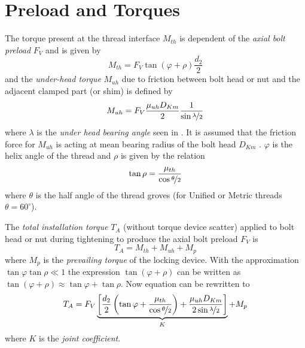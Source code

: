 \section{Preload and Torques}
The torque present at the thread interface $M_{th}$ is dependent of the \emph{axial bolt preload} $F_V$ 
and is given by
\begin{equation}
  M_{th} = F_V \tan(\varphi+\rho)\frac{d_2}{2}
\end{equation}
and the \emph{under-head torque} $M_{uh}$ due to friction between bolt head or nut and the adjacent 
clamped part (or shim) is defined by
\begin{equation}
  M_{uh} = F_V \frac{\mu_{uh} D_{Km}}{2} \frac{1}{\sin{\nicefrac{\lambda}{2}}}
\end{equation}
where $\lambda$ is the \emph{under head bearing angle} seen in .
It is assumed that the friction force for $M_{uh}$ is acting at mean bearing radius of the bolt head 
$D_{Km}$ . $\varphi$ is the helix angle of the thread and $\rho$ is given by the relation
\begin{equation}
  \tan\rho = \frac{\mu_{th}}{\cos\nicefrac{\theta}{2}}
\end{equation}
where $\theta$ is the half angle of the thread groves (for Unified or Metric threads $\theta=60^\circ$).

The \emph{total installation torque} $T_A$ (without torque device scatter) applied to bolt head or nut
during tightening to produce the axial bolt preload $F_V$ is 
\begin{equation}
  T_A = M_{th} + M_{uh} + M_p
  \label{equ:TA}
\end{equation}
where $M_p$ is the \emph{prevailing torque} of the locking device. 
With the approximation $\tan\varphi \tan\rho \ll 1$ the expression $\tan(\varphi+\rho)$ can be written
as $\tan(\varphi+\rho) \approx \tan\varphi + \tan\rho$. Now equation  can be rewritten to
\begin{equation}
  T_A = F_V \underbrace{ \left[ \frac{d_2}{2} \left( \tan\varphi + \frac{\mu_{th}}{\cos\nicefrac{\theta}{2}} \right) 
  + \frac{\mu_{uh} D_{Km}}{2 \sin\nicefrac{\lambda}{2}} \right]}_{K} + M_p
  \label{equ:TA2}
\end{equation}
where $K$ is the \emph{joint coefficient}.

